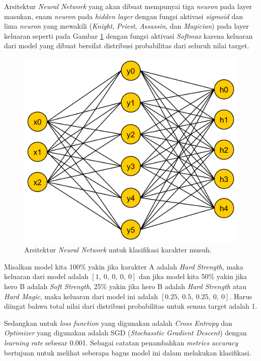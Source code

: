 Arsitektur \textit{Neural Network} yang akan dibuat mempunyai tiga \textit{neuron} pada layer masukan, enam \textit{neuron} pada \textit{hidden layer} dengan fungsi aktivasi \textit{sigmoid} dan lima \textit{neuron} yang mewakili (\textit{Knight}, \textit{Priest}, \textit{Assassin}, dan \textit{Magician}) pada layer keluaran seperti pada Gambar \ref{fig:nn_enemy} dengan fungsi aktivasi \textit{Softmax} karena keluaran dari model yang dibuat bersifat distribusi probabilitas dari seluruh nilai target.

\begin{figure} [!h] \centering
	\includegraphics[scale=0.075]{img/nn_enemy_character.png}
	\caption{Arsitektur \textit{Neural Network} untuk klasifikasi karakter musuh.}
	\label{fig:nn_enemy}
\end{figure}

Misalkan model kita 100\% yakin jika karakter A adalah \textit{Hard Strength}, maka keluaran dari model adalah $\left[1,\ 0,\ 0,\ 0,\ 0 \right]$ dan jika model kita 50\% yakin jika hero B adalah \textit{Soft Strength}, 25\% yakin jika hero B adalah \textit{Hard Strength} atau \textit{Hard Magic}, maka keluaran dari model ini adalah $\left[0.25,\ 0.5,\ 0.25, \ 0, \ 0 \right]$. Harus diingat bahwa total nilai dari distribusi probabilitas untuk semua target adalah 1.
\vspace{1ex}

Sedangkan untuk \textit{loss function} yang digunakan adalah \textit{Cross Entropy} dan \textit{Optimizer} yang digunakan adalah SGD (\textit{Stochasstic Gradient Descent}) dengan \textit{learning rate} sebesar 0.001. Sebagai catatan penambahkan \textit{metrics accuracy} bertujuan untuk melihat seberapa bagus model ini dalam melakukan klasifikasi.
\vspace{1ex}

